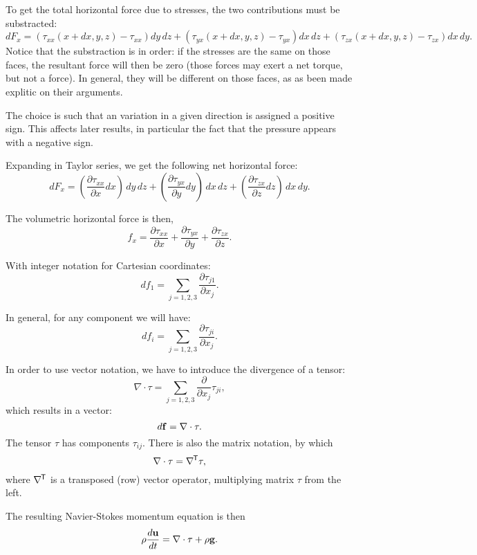 To get the total horizontal force due to stresses, the two contributions
must be substracted:
\[
dF_x =
\left( \tau_{xx}(x+dx,y   ,z   ) - \tau_{xx} \right) dy\, dz +
\left( \tau_{yx}(x+dx,y   ,z   ) - \tau_{yx} \right)  dx\, dz +
\left( \tau_{zx}(x+dx,y   ,z   ) - \tau_{zx} \right) dx\, dy .
\]
Notice that the substraction is in order: if the stresses are the same
on those faces, the resultant force will then be zero (those forces
may exert a net torque, but not a force).  In general, they will be
different on those faces, as as been made explitic on their arguments.

The choice is such that an variation in a given direction is assigned
a positive sign. This affects later results, in particular the fact
that the pressure appears with a negative sign.

Expanding in Taylor series, we get the following net horizontal force:
\[
 dF_x  =
 \left(\frac{\partial\tau_{xx}}{\partial x}  dx\right)\, dy\, dz
+\left(\frac{\partial\tau_{yx}}{\partial y}  dy\right)\, dx\, dz
+\left(\frac{\partial\tau_{zx}}{\partial z}  dz\right)\, dx\, dy .
\]

The volumetric horizontal force is then,
\[
f_x  =
 \frac{\partial\tau_{xx}}{\partial x}
+\frac{\partial\tau_{yx}}{\partial y}
+\frac{\partial\tau_{zx}}{\partial z} .
\]

With integer notation for Cartesian coordinates:
\[
 df_1  =
 \sum_{j=1,2,3}
 \frac{\partial\tau_{j1}}{\partial x_j} .
\]


In general, for any component we will have:
\[
 df_i  =
 \sum_{j=1,2,3}
  \frac{\partial\tau_{ji}}{\partial x_j} .
\]

In order to use vector notation, we have to introduce the
divergence of a tensor:
\[
\nabla \cdot \tau = \sum_{j=1,2,3}
  \frac{\partial}{\partial x_j}  \tau_{ji} ,
\]
 which results in a vector:
\[
 d\mathbf{f}  =
 \nabla \cdot \tau .
\]
%
The tensor $\tau$ has components $\tau_{ij}$. There is also
the matrix notation, by which
\[
\nabla \cdot \tau = \nabla^{\mkern-1.5mu\mathsf{T}}  \tau ,
\]
where $\nabla^{\mkern-1.5mu\mathsf{T}}$ is a transposed (row) vector operator, multiplying
matrix $\tau$ from the left.

The resulting Navier-Stokes momentum equation is then
\begin{equation}
  \label{eq:NS}
  \rho \frac{d\mathbf{u} }{dt} = \nabla \cdot \tau   + \rho \mathbf{g} .
\end{equation}



